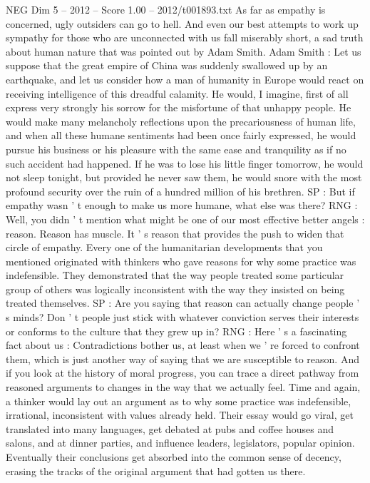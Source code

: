 \begin{textsample}{NEG Dim 5 – 2012 – Score 1.00 – 2012/t001893.txt}
As far as empathy is concerned, ugly outsiders can go to hell.
And even our best attempts to work up sympathy for those who are unconnected with us fall miserably short, a sad truth about human nature that was pointed out by Adam Smith.
Adam Smith : Let us suppose that the great empire of China was suddenly swallowed up by an earthquake, and let us consider how a man of humanity in Europe would react on receiving intelligence of this dreadful calamity.
He would, I imagine, first of all express very strongly his sorrow for the misfortune of that unhappy people.
He would make many melancholy reflections upon the precariousness of human life, and when all these humane sentiments had been once fairly expressed, he would pursue his business or his pleasure with the same ease and tranquility as if no such accident had happened.
If he was to lose his little finger tomorrow, he would not sleep tonight, but provided he never saw them, he would snore with the most profound security over the ruin of a hundred million of his brethren.
SP : But if empathy wasn ' t enough to make us more humane, what else was there?
RNG : Well, you didn ' t mention what might be one of our most effective better angels : reason.
Reason has muscle.
It ' s reason that provides the push to widen that circle of empathy.
Every one of the humanitarian developments that you mentioned originated with thinkers who gave reasons for why some practice was indefensible.
They demonstrated that the way people treated some particular group of others was logically inconsistent with the way they insisted on being treated themselves.
SP : Are you saying that reason can actually change people ' s minds?
Don ' t people just stick with whatever conviction serves their interests or conforms to the culture that they grew up in?
RNG : Here ' s a fascinating fact about us : Contradictions bother us, at least when we ' re forced to confront them, which is just another way of saying that we are susceptible to reason.
And if you look at the history of moral progress, you can trace a direct pathway from reasoned arguments to changes in the way that we actually feel.
Time and again, a thinker would lay out an argument as to why some practice was indefensible, irrational, inconsistent with values already held.
Their essay would go viral, get translated into many languages, get debated at pubs and coffee houses and salons, and at dinner parties, and influence leaders, legislators, popular opinion.
Eventually their conclusions get absorbed into the common sense of decency, erasing the tracks of the original argument that had gotten us there.

\end{textsample}
